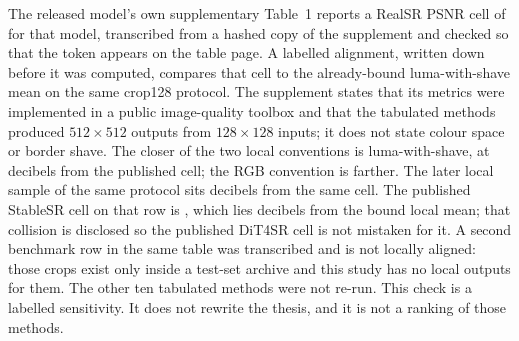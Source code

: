 The released model's own supplementary Table~1 reports a RealSR PSNR cell of
\PublishedDitPsnr{} for that model, transcribed from a hashed copy of the
supplement and checked so that the token appears on the table page. A labelled
alignment, written down before it was computed, compares that cell to the
already-bound luma-with-shave mean on the same crop128 protocol. The
supplement states that its metrics were implemented in a public image-quality
toolbox and that the tabulated methods produced $512\times 512$ outputs from
$128\times 128$ inputs; it does not state colour space or border shave. The
closer of the two local conventions is luma-with-shave, at
\PublishedAlignDelta{} decibels from the published cell; the RGB convention
is farther. The later local sample of the same protocol sits
\PublishedAlignLocalDelta{} decibels from the same cell. The published
StableSR cell on that row is \PublishedStableSR{}, which lies
\PublishedCollisionDelta{} decibels from the bound local mean; that collision
is disclosed so the published DiT4SR cell is not mistaken for it. A second
benchmark row in the same table was transcribed and is not locally aligned:
those crops exist only inside a test-set archive and this study has no local
outputs for them. The other ten tabulated methods were not re-run. This check
is a labelled sensitivity. It does not rewrite the thesis, and it is not a
ranking of those methods.

